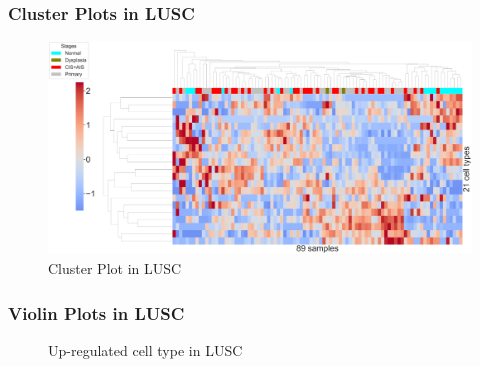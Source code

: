 \documentclass{beamer}
\begin{document}
    \begin{frame}
        \frametitle{Cluster Plots in LUSC}

        \begin{figure}
            \includegraphics[width=0.9 \linewidth]{figures/BisqueRNA/clustermap/STAR.FPKM.GSE162498.SQC.pdf}
            \caption{Cluster Plot in LUSC}
        \end{figure}
    \end{frame}

    \begin{frame}[allowframebreaks]
        \frametitle{Violin Plots in LUSC}

        \begin{figure}
            \caption{Up-regulated cell type in LUSC}
        \end{figure}
    \end{frame}
\end{document}
